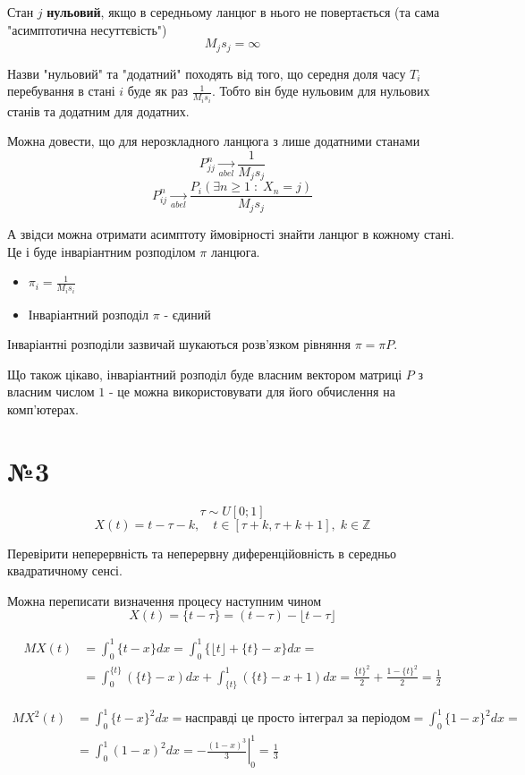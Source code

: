 \documentclass[11pt, a4paper]{article} %
\begin{document}
Стан $j$ \textbf{нульовий}, якщо в середньому ланцюг в нього не повертається (та сама "асимптотична несуттєвість")
\[M_js_j = \infty\]

Назви "нульовий" та "додатний" походять від того, що середня доля часу $T_i$ перебування в стані $i$ буде як раз $\frac{1}{M_is_i}$.
Тобто він буде нульовим для нульових станів та додатним для додатних.

Можна довести, що для нерозкладного ланцюга з лише додатними станами
\[P^n_{jj} \underset{abel}{\longrightarrow} \frac{1}{M_j s_j}\]
\[P^n_{ij} \underset{abel}{\longrightarrow} \frac{P_i(\exists n\ge 1 \;:\; X_n = j)}{M_j s_j}\]

А звідси можна отримати асимптоту ймовірності знайти ланцюг в кожному стані.  
Це і буде інваріантним розподілом $\pi$ ланцюга.
\begin{itemize}
    \item $\pi_i = \frac{1}{M_i s_i}$
    \item Інваріантний розподіл $\pi$ - єдиний 
\end{itemize}

Інваріантні розподіли зазвичай шукаються розв'язком рівняння $\pi = \pi P$. 

Що також цікаво, інваріантний розподіл буде власним вектором матриці $P$ з власним числом $1$ - 
це можна використовувати для його обчислення на комп'ютерах.  


\section*{№3}
\begin{mdframed}
    \[\tau \sim U[0;1]\]
    \[X(t) = t-\tau-k, \quad t\in[\tau+k,\tau+k+1], \; k\in\mathbb Z\]

    Перевірити неперервність та неперервну диференційовність в середньо квадратичному сенсі.
\end{mdframed}


Можна переписати визначення процесу наступним чином
\[X(t) = \{t-\tau\} = (t-\tau) - \lfloor t-\tau\rfloor\]

\begin{align*}
    MX(t) &= \int_0^1 \{t-x\} dx = \int_0^1 \{\lfloor t \rfloor + \{t\} - x\} dx = \\
    &= \int_0^{\{t\}} (\{t\}-x) dx + \int_{\{t\}}^1 (\{t\}-x+1)dx = \frac{\{t\}^2}{2} + \frac{1-\{t\}^2}{2} = \frac{1}{2}
\end{align*}

\begin{align*}
    MX^2(t) &= \int_0^1 \{t-x\}^2 dx = \text{насправді це просто інтеграл за періодом} = \int_{0}^{1} \{1-x\}^2dx = \\
    &= \int_0^1 (1-x)^2dx = \left.-\frac{(1-x)^3}{3}\right|_0^1 = \frac{1}{3}
\end{align*}
\end{document}
